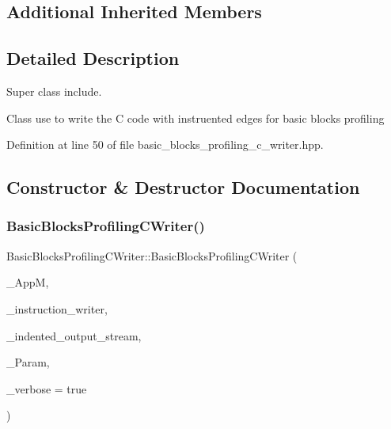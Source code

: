 \subsection*{Additional Inherited Members}


\subsection{Detailed Description}
Super class include. 

Class use to write the C code with instruented edges for basic blocks profiling 

Definition at line 50 of file basic\+\_\+blocks\+\_\+profiling\+\_\+c\+\_\+writer.\+hpp.



\subsection{Constructor \& Destructor Documentation}
\mbox{\label{classBasicBlocksProfilingCWriter_a98132f12de7228626ad6444f12ed84cc}} 
\subsubsection{\texorpdfstring{Basic\+Blocks\+Profiling\+C\+Writer()}{BasicBlocksProfilingCWriter()}}
{\footnotesize\ttfamily Basic\+Blocks\+Profiling\+C\+Writer\+::\+Basic\+Blocks\+Profiling\+C\+Writer (\begin{DoxyParamCaption}\item[{const \hyperlink{application__manager_8hpp_abb985163a2a3fb747f6f03b1eaadbb44}{application\+\_\+manager\+Const\+Ref}}]{\+\_\+\+AppM,  }\item[{const \hyperlink{instruction__writer_8hpp_a40ea26c38a2909ba48f88f997144b260}{Instruction\+Writer\+Ref}}]{\+\_\+instruction\+\_\+writer,  }\item[{const \hyperlink{indented__output__stream_8hpp_ab32278e11151ef292759c88e99b77feb}{Indented\+Output\+Stream\+Ref}}]{\+\_\+indented\+\_\+output\+\_\+stream,  }\item[{const \hyperlink{Parameter_8hpp_a37841774a6fcb479b597fdf8955eb4ea}{Parameter\+Const\+Ref}}]{\+\_\+\+Param,  }\item[{bool}]{\+\_\+verbose = {\ttfamily true} }\end{DoxyParamCaption})}



